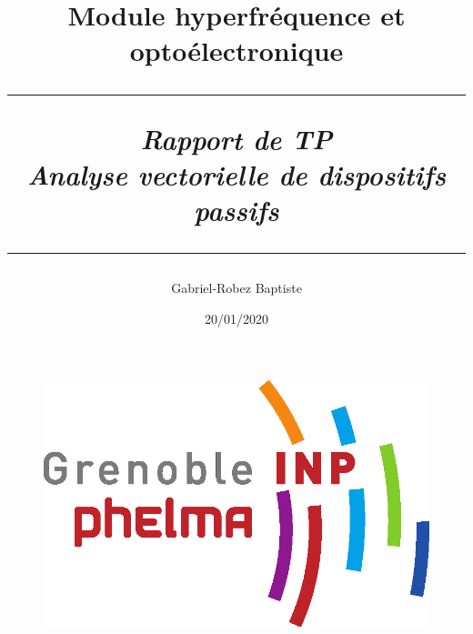 \documentclass{article}
\title{Module hyperfréquence et optoélectronique \\ \bigskip \bigskip \hrule width 16.5cm \bigskip \textit{Rapport de TP \\ Analyse vectorielle de dispositifs passifs \\} \bigskip \hrule width 16.5cm}
\author{Gabriel-Robez Baptiste}
\date{20/01/2020}
\begin{document}
\maketitle

\renewcommand{\contentsname}{Sommaire}  %
\tableofcontents

\bigskip

\begin{figure}[!ht]
\centering
\includegraphics[scale=0.15]{logo_phelma.png}
\end{figure}
\clearpage
\end{document}
